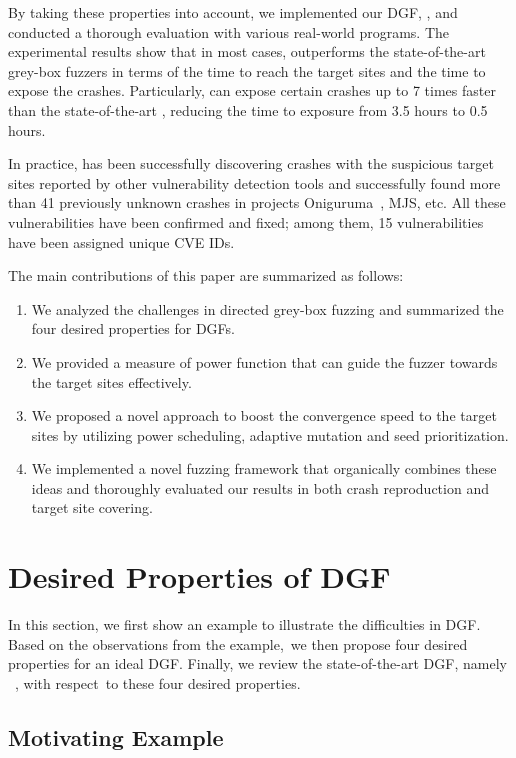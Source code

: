 By taking these properties into account, we implemented our DGF, {\dFOT}, and conducted a thorough evaluation with various real-world programs. 
The experimental results show that in most cases, {\dFOT} outperforms the state-of-the-art grey-box fuzzers in terms of the time to reach the target sites and the time to expose the crashes.
Particularly, {\dFOT} can expose certain crashes up to 7 times faster than the state-of-the-art \aflgo, reducing the time to exposure from 3.5 hours to 0.5 hours.

In practice, \dFOT has been successfully discovering crashes with the suspicious target sites reported by other vulnerability detection tools and successfully found more than 41 previously unknown crashes in projects Oniguruma~\cite{oniguruma}, MJS\cite{mjs}, etc. All these vulnerabilities have been confirmed and fixed; among them, 15 vulnerabilities have been assigned unique CVE IDs.

The main contributions of this paper are summarized as follows:
\begin{enumerate}[(1)] 
\itemsep0em
\item We analyzed the challenges in directed grey-box fuzzing and summarized the four desired properties for DGFs.
\item We provided a measure of power function that can guide the fuzzer towards the target sites effectively.
\item We proposed a novel approach to boost the convergence speed to the target sites by utilizing power scheduling, adaptive mutation and seed prioritization.
\item We implemented a novel fuzzing framework that organically combines these ideas and thoroughly evaluated our results in both crash reproduction and target site covering.
\end{enumerate} 

\section{Desired Properties of DGF}\label{sec:mx}

In this section, we first show an example to illustrate the difficulties in DGF.
Based on the observations from the example,~we then propose four desired properties for an ideal DGF.
Finally, we review the state-of-the-art DGF, namely \aflgo~\cite{Bohme:2017:DGF}, with respect~to these four desired properties. 


\subsection{Motivating Example}\label{subsec:motiv}



